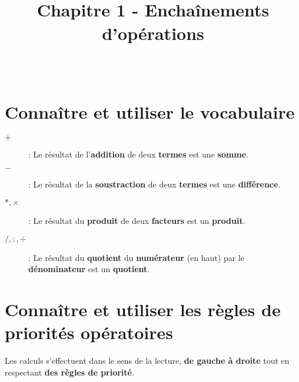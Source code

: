 \documentclass[paper=a4, fontsize=10pt]{scrartcl} %
\title{	
\vspace{-10ex}
\horrule{0.5pt} \\[0.4cm] %
\huge Chapitre 1 - Enchaînements d'opérations\\ %
\horrule{2pt} \\[0.5cm] %
}
\author{}
\date{\vspace{-10ex}} %
\begin{document}

\newtheorem{Definition}{Définition}
\newtheorem{Theorem}{Théorème}
\newtheorem{Proposition}{Proposition}

\renewcommand{\labelitemi}{$\bullet$}
\renewcommand{\labelitemii}{$\circ$}

\maketitle

\section{Connaître et utiliser le vocabulaire}

\begin{description}
\item[$+$] : Le résultat de l'\textbf{addition} de deux \textbf{termes} est une \textbf{somme}.
\item[$-$] : Le résultat de la \textbf{soustraction} de deux \textbf{termes} est une \textbf{différence}.
\item[$*,\times$] : Le résultat du \textbf{produit} de deux \textbf{facteurs} est un \textbf{produit}.
\item[$/,:,\div$] :  Le résultat du \textbf{quotient} du \textbf{numérateur} (en haut) par le \textbf{dénominateur} est un \textbf{quotient}.
\end{description}

\section{Connaître et utiliser les règles de priorités opératoires}

Les calculs s’effectuent dans le sens de la lecture, \textbf{de gauche à droite} tout en respectant \textbf{des règles de priorité}. 
\end{document}

